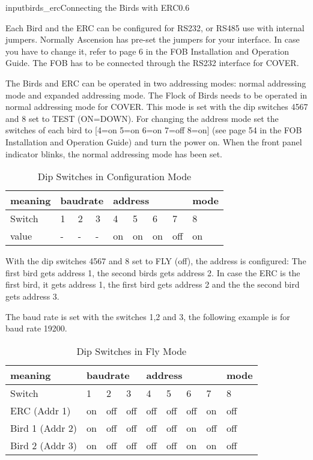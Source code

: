 \begin{covimg}{input}{birds_erc}{Connecting the Birds with ERC}{0.6}\end{covimg}

Each Bird and the ERC can be configured for RS232, or RS485 use with internal
jumpers. Normally Ascension has pre-set the jumpers for your interface. In
case you have to change it, refer to page 6 in the FOB Installation and Operation Guide.
The FOB has to be connected through the RS232 interface for COVER.

The Birds and ERC can be operated in two addressing modes:
normal addressing mode and expanded addressing mode. The Flock of Birds
needs to be operated in normal addressing mode for COVER. This mode is set
with the dip switches 4567 and 8 set to TEST (ON=DOWN). 
For changing the address mode set the switches
of each bird to [4=on 5=on 6=on 7=off 8=on] (see page 54 in the FOB Installation 
and Operation Guide) and turn the power on. When the front panel indicator blinks,
the normal addressing mode has been set.
\begin{table}[!hHtb]
\begin{center}
\begin{tabular}{|l|l|l|l|l|l|l|l|l|}

\hline
meaning & \multicolumn{3}{|l|}{baudrate} &\multicolumn{4}{|l|}{address}&mode\\
\hline
Switch&1&2&3&4&5&6&7&8\\
\hline
value&-&-&-&on&on&on&off& on\\
\hline
\end{tabular}
\end{center}
\caption{Dip Switches in Configuration Mode}

\end{table}

With the dip switches 4567 and 8 set to FLY (off), the address is configured:
The first bird gets address 1,
the second birds gets address 2.
In case the ERC is the first bird, it gets address 1, the first bird gets address 2 and
the the second bird gets address 3.

The baud rate is set with the switches 1,2 and 3, the following example is 
for baud rate 19200.

\begin{table}[!hHtb]
\begin{center}
\begin{tabular}{|l|l|l|l|l|l|l|l|l|}

\hline
meaning & \multicolumn{3}{|l|}{baudrate} &\multicolumn{4}{|l|}{address}&mode\\
\hline
Switch&1&2&3&4&5&6&7&8\\
\hline
ERC (Addr 1)&on&off&off&off&off&off&on&off\\
\hline
Bird 1 (Addr 2)&on&off&off&off&off&on&off& off\\
\hline
Bird 2 (Addr 3)&on&off&off&off&off&on&on& off\\
\hline
\end{tabular}
\end{center}
\caption{Dip Switches in Fly Mode}

\end{table}




